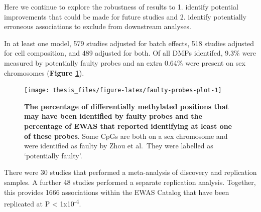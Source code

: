 \documentclass[11pt,oneside]{bristolthesis}
\begin{document}
Here we continue to explore the robustness of results to 1. identify potential improvements that could be made for future studies and 2. identify potentially erroneous associations to exclude from downstream analyses.

In at least one model, 579 studies adjusted for batch effects, 518 studies adjusted for cell composition, and 489 adjusted for both. Of all DMPs identifed, 9.3\% were measured by potentially faulty probes and an extra 0.64\% were present on sex chromosomes (\textbf{Figure \ref{fig:faulty-probes-plot}}).




\begin{figure}

{\centering \texttt{[image: thesis\_files/figure-latex/faulty-probes-plot-1]} 

}

\caption[The percentage of differentially methylated positions that may have been identified by faulty probes and the percentage of EWAS that reported identifying at least one of these probes]{\textbf{The percentage of differentially methylated positions that may have been identified by faulty probes and the percentage of EWAS that reported identifying at least one of these probes}. Some CpGs are both on a sex chromosome and were identified as faulty by Zhou et al.~They were labelled as `potentially faulty'.}\label{fig:faulty-probes-plot}
\end{figure}
There were 30 studies that performed a meta-analysis of discovery and replication samples. A further 48 studies performed a separate replication analysis. Together, this provides 1666 associations within the EWAS Catalog that have been replicated at P \textless{} 1x10\textsuperscript{-4}.
\end{document}
